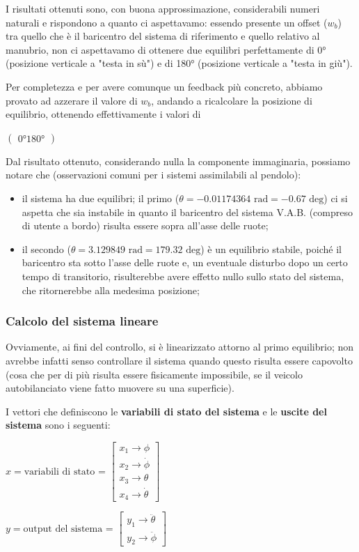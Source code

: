 I risultati ottenuti sono, con buona approssimazione, considerabili numeri naturali e rispondono a quanto ci aspettavamo: essendo presente un offset ($w_b$) tra quello che è il baricentro del sistema di riferimento e quello relativo al manubrio, non ci aspettavamo di ottenere due equilibri perfettamente di 0° (posizione verticale a "testa in sù") e di 180° (posizione verticale a "testa in giù").

Per completezza e per avere comunque un feedback più concreto, abbiamo provato ad azzerare il valore di $w_b$, andando a ricalcolare la posizione di equilibrio, ottenendo effettivamente i valori di
\begin{center}
	$\left(\begin{array}{c}
	0°
	180°
	\end{array}\right)$
\end{center}

Dal risultato ottenuto, considerando nulla la componente immaginaria, possiamo notare che (osservazioni comuni per i sistemi assimilabili al pendolo):

\begin{itemize}
	\item il sistema ha due equilibri; il primo ($\theta = -0.01174364 \text{ rad} = -0.67 \text{ deg}$) ci si aspetta che sia instabile in quanto il baricentro del sistema V.A.B. (compreso di utente a bordo) risulta essere sopra all'asse delle ruote;
	\item il secondo ($\theta = 3.129849 \text{ rad} = 179.32 \text{ deg}$) è un equilibrio stabile, poiché il baricentro sta sotto l'asse delle ruote e, un eventuale disturbo dopo un certo tempo di transitorio, risulterebbe avere effetto nullo sullo stato del sistema, che ritornerebbe alla medesima posizione;
\end{itemize}

\subsubsection{Calcolo del sistema lineare}
Ovviamente, ai fini del controllo, si è linearizzato attorno al primo equilibrio; non avrebbe infatti senso controllare il sistema quando questo risulta essere capovolto (cosa che per di più risulta essere fisicamente impossibile, se il veicolo autobilanciato viene fatto muovere su una superficie).

I vettori che definiscono le \textbf{variabili di stato del sistema} e le \textbf{uscite del sistema} sono i seguenti:
\begin{center}
	$
	x=\text{variabili di stato = }\left\lbrack 
	\begin{array}{c}
		x_1 \to \phi\\
		x_2 \to \dot{\phi}\\
		x_3 \to \theta\\
		x_4 \to \dot{\theta} 
	\end{array}\right\rbrack
	$
	
	$
	y=\text{output del sistema = }\left\lbrack 
	\begin{array}{c}
		y_1 \to \ddot{\theta}\\
		y_2 \to \ddot{\phi}
	\end{array}\right\rbrack
	$
\end{center}

